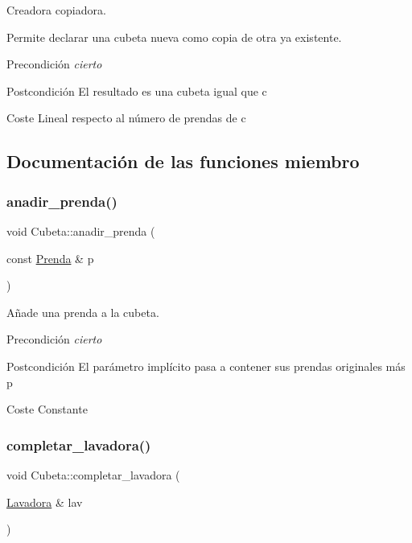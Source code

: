 Creadora copiadora. 

Permite declarar una cubeta nueva como copia de otra ya existente. \begin{DoxyPrecond}{Precondición}
{\itshape cierto} 
\end{DoxyPrecond}
\begin{DoxyPostcond}{Postcondición}
El resultado es una cubeta igual que c 
\end{DoxyPostcond}
\begin{DoxyParagraph}{Coste}
Lineal respecto al número de prendas de c 
\end{DoxyParagraph}


\subsection{Documentación de las funciones miembro}
\mbox{\label{class_cubeta_a431873df8f99cebe56b4787a5271e395}} 
\subsubsection{\texorpdfstring{anadir\+\_\+prenda()}{anadir\_prenda()}}
{\footnotesize\ttfamily void Cubeta\+::anadir\+\_\+prenda (\begin{DoxyParamCaption}\item[{const \hyperlink{class_prenda}{Prenda} \&}]{p }\end{DoxyParamCaption})}



Añade una prenda a la cubeta. 

\begin{DoxyPrecond}{Precondición}
{\itshape cierto} 
\end{DoxyPrecond}
\begin{DoxyPostcond}{Postcondición}
El parámetro implícito pasa a contener sus prendas originales más p 
\end{DoxyPostcond}
\begin{DoxyParagraph}{Coste}
Constante 
\end{DoxyParagraph}
\mbox{\label{class_cubeta_a60a5a4f4133ce02f1e4fe49bbe8b9ec7}} 
\subsubsection{\texorpdfstring{completar\+\_\+lavadora()}{completar\_lavadora()}}
{\footnotesize\ttfamily void Cubeta\+::completar\+\_\+lavadora (\begin{DoxyParamCaption}\item[{\hyperlink{class_lavadora}{Lavadora} \&}]{lav }\end{DoxyParamCaption})}



